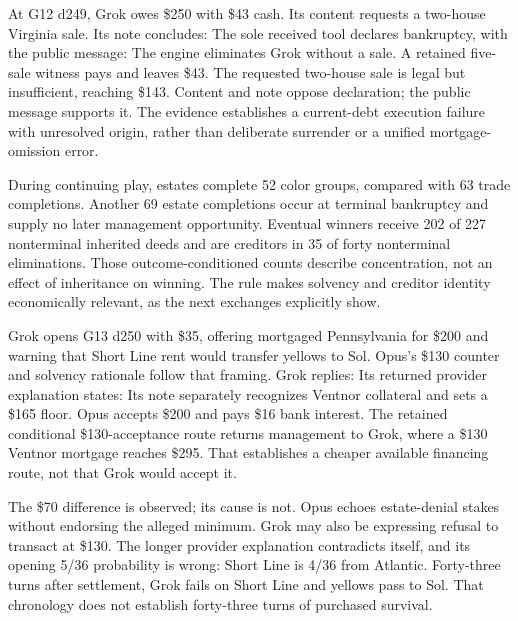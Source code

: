 
At G12 d249, Grok owes \$250 with \$43 cash. Its content requests a two-house Virginia sale. Its note concludes:
The sole received tool declares bankruptcy, with the public message:
The engine eliminates Grok without a sale. A retained five-sale witness pays and leaves \$43. The requested two-house sale is legal but insufficient, reaching \$143. Content and note oppose declaration; the public message supports it. The evidence establishes a current-debt execution failure with unresolved origin, rather than deliberate surrender or a unified mortgage-omission error.

During continuing play, estates complete 52 color groups, compared with 63 trade completions. Another 69 estate completions occur at terminal bankruptcy and supply no later management opportunity. Eventual winners receive 202 of 227 nonterminal inherited deeds and are creditors in 35 of forty nonterminal eliminations. Those outcome-conditioned counts describe concentration, not an effect of inheritance on winning. The rule makes solvency and creditor identity economically relevant, as the next exchanges explicitly show.


Grok opens G13 d250 with \$35, offering mortgaged Pennsylvania for \$200 and warning that Short Line rent would transfer yellows to Sol. Opus's \$130 counter and solvency rationale follow that framing. Grok replies:
Its returned provider explanation states:
Its note separately recognizes Ventnor collateral and sets a \$165 floor. Opus accepts \$200 and pays \$16 bank interest. The retained conditional \$130-acceptance route returns management to Grok, where a \$130 Ventnor mortgage reaches \$295. That establishes a cheaper available financing route, not that Grok would accept it.

The \$70 difference is observed; its cause is not. Opus echoes estate-denial stakes without endorsing the alleged minimum. Grok may also be expressing refusal to transact at \$130. The longer provider explanation contradicts itself, and its opening 5/36 probability is wrong: Short Line is 4/36 from Atlantic. Forty-three turns after settlement, Grok fails on Short Line and yellows pass to Sol. That chronology does not establish forty-three turns of purchased survival.

